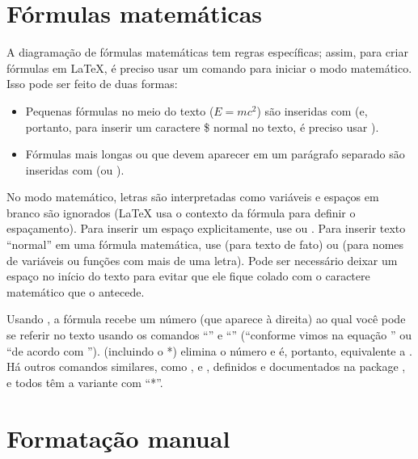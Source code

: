 \section{Fórmulas matemáticas}

\enlargethispage{-.5\baselineskip}

A diagramação de fórmulas matemáticas tem regras específicas; assim, para
criar fórmulas em \LaTeX{}, é preciso usar um comando para iniciar o modo
matemático. Isso pode ser feito de duas formas:

\begin{itemize}
  \item Pequenas fórmulas no meio do texto ($E=mc^2$) são inseridas com
   (e, portanto, para inserir um caractere \$
  normal no texto, é preciso usar \cmd{\sla{}\$}).

  \item Fórmulas mais longas ou que devem aparecer em um parágrafo
  separado são inseridas com  (ou
  ).
\end{itemize}

No modo matemático, letras são interpretadas como variáveis e espaços
em branco são ignorados (\LaTeX{} usa o contexto da fórmula para
definir o espaçamento). Para inserir um espaço explicitamente, use
 ou . Para inserir texto ``normal'' em
uma fórmula matemática, use  (para texto de fato)
ou  (para nomes de variáveis ou funções com
mais de uma letra). Pode ser necessário deixar um espaço no início do
texto para evitar que ele fique colado com o caractere matemático que
o antecede.

Usando , a fórmula recebe um número (que
aparece à direita) ao qual você pode se referir no texto usando os
comandos ``'' e ``'' (``\textsf{conforme
vimos na equação }'' ou
``\textsf{de acordo com }'').
 (incluindo o *) elimina o número e é,
portanto, equivalente a . Há outros
comandos similares, como ,  e ,
definidos e documentados na package , e todos têm
a variante com ``*''.

\section{Formatação manual}


